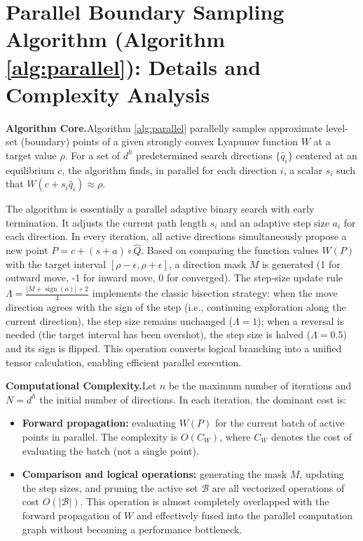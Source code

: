 \documentclass[journal]{IEEEtran}
\begin{document}
\onecolumn
{\appendices
\section{Parallel Boundary Sampling Algorithm (Algorithm \ref{alg:parallel}): Details and Complexity Analysis}
\label{app:Alg2}
\noindent \textbf{Algorithm Core.}\quad Algorithm \ref{alg:parallel} parallelly samples approximate level-set (boundary) points of a given strongly convex Lyapunov function $W$ at a target value $\rho$. For a set of $d^h$ predetermined search directions $\{\hat{q}_i\}$ centered at an equilibrium $c$, the algorithm finds, in parallel for each direction $i$, a scalar $s_i$ such that $W(c + s_i \hat{q}_i) \approx \rho$.

The algorithm is essentially a parallel adaptive binary search with early termination. It adjusts the current path length $s_i$ and an adaptive step size $a_i$ for each direction.  In every iteration, all active directions simultaneously propose a new point $P = c + (s + a) \circ \hat{Q}$. Based on comparing the function values $W(P)$ with the target interval $[\rho-\epsilon, \rho+\epsilon]$, a direction mask $M$ is generated (1 for outward move, -1 for inward move, 0 for converged). The step‑size update rule $\Lambda = \frac{|M + \operatorname{sign}(a)| + 2}{4}$ implements the classic bisection strategy: when the move direction agrees with the sign of the step (i.e., continuing exploration along the current direction), the step size remains unchanged ($\Lambda=1$); when a reversal is needed (the target interval has been overshot), the step size is halved ($\Lambda=0.5$) and its sign is flipped. This operation converts logical branching into a unified tensor calculation, enabling efficient parallel execution.

\noindent \textbf{Computational Complexity.}\quad Let $n$ be the maximum number of iterations and $N = d^h$ the initial number of directions. In each iteration, the dominant cost is:
\begin{itemize}
	\item \textbf{Forward propagation:} evaluating $W(P)$ for the current batch of active points in parallel. The complexity is $O(C_W)$, where $C_W$ denotes the cost of evaluating the batch (not a single point).
	\item \textbf{Comparison and logical operations:} generating the mask $M$, updating the step sizes, and pruning the active set $\mathcal{B}$ are all vectorized operations of cost $O(|\mathcal{B}|)$. This operation is almost completely overlapped with the forward propagation of $W$ and effectively fused into the parallel computation graph without becoming a performance bottleneck.
\end{itemize}

}
\end{document}
